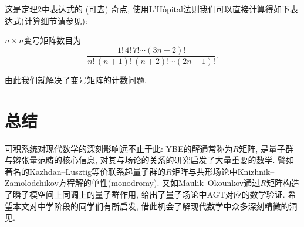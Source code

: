 \documentclass[twoside]{article}
\begin{document}
这是定理2中表达式的 (可去) 奇点, 使用L'H\^opital法则我们可以直接计算得如下表达式(计算细节请参见\cite{10.1155/S1073792896000128}): 
\begin{theorem}
$n\times n$变号矩阵数目为
\[ \frac{1! \, 4! \, 7! \cdots (3n-2)!}{n! \, (n+1)! \, (n+2)! \cdots (2n-1)!}. \]
\end{theorem}
由此我们就解决了变号矩阵的计数问题. 

\section{总结}
可积系统对现代数学的深刻影响远不止于此: YBE的解通常称为$R$矩阵, 是量子群与辫张量范畴的核心信息, 对其与场论的关系的研究启发了大量重要的数学. 譬如著名的Kazhdan--Lusztig等价联系起量子群的$R$矩阵与共形场论中Knizhnik--Zamolodchikov方程解的单性(monodromy). 又如Maulik--Okounkov通过$R$矩阵构造了瞬子模空间上同调上的量子群作用, 给出了量子场论中AGT对应的数学验证. 希望本文对中学阶段的同学们有所启发, 借此机会了解现代数学中众多深刻精微的洞见. 

\printbibliography
\end{document}

